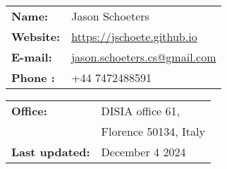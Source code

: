 \documentclass[french]{resume} %
\begin{document}
	
	\begin{minipage}[t]{0.49\textwidth}
		\begin{tabular}{ m{7em} m{15em} }
			\textbf{Name:} & Jason Schoeters\\
			\textbf{Website:} & \url{https://jschoete.github.io}\\
			\textbf{E-mail: } & \href{mailto:jason.schoeters.cs@gmail.com}{jason.schoeters.cs@gmail.com}\\
			\textbf{Phone : } & +44 7472488591\\
		\end{tabular}
	\end{minipage} 
	\begin{minipage}[t]{0.49\textwidth}
		\begin{tabular}{ m{8em} m{20em} }
			\textbf{Office:} & DISIA office 61,\\
			&Florence 50134, \newline Italy\\
			\textbf{Last updated:} & December 4 2024
		\end{tabular}
	\end{minipage} 
	
\end{document}
